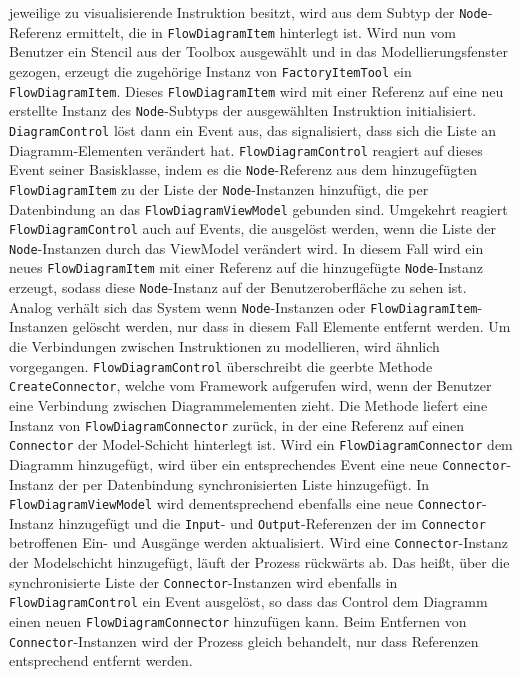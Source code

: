 jeweilige zu visualisierende Instruktion besitzt, wird aus dem Subtyp der \texttt{Node}-Referenz ermittelt, die in \texttt{FlowDiagramItem} hinterlegt ist.
\newline
Wird nun vom Benutzer ein Stencil aus der Toolbox ausgewählt und in das Modellierungsfenster gezogen, erzeugt die zugehörige Instanz von \texttt{FactoryItemTool} ein \texttt{FlowDiagramItem}. Dieses \texttt{FlowDiagramItem} wird mit einer Referenz auf eine neu erstellte Instanz des \texttt{Node}-Subtyps der ausgewählten Instruktion initialisiert. \texttt{DiagramControl} löst dann ein Event aus, das signalisiert, dass sich die Liste an Diagramm-Elementen verändert hat. \texttt{FlowDiagramControl} reagiert auf dieses Event seiner Basisklasse, indem es die \texttt{Node}-Referenz aus dem hinzugefügten \texttt{FlowDiagramItem} zu der Liste der \texttt{Node}-Instanzen hinzufügt, die per Datenbindung an das \texttt{FlowDiagramViewModel} gebunden sind. Umgekehrt reagiert \texttt{FlowDiagramControl} auch auf Events, die ausgelöst werden, wenn die Liste der \texttt{Node}-Instanzen durch das ViewModel verändert wird. In diesem Fall wird ein neues \texttt{FlowDiagramItem} mit einer Referenz auf die hinzugefügte \texttt{Node}-Instanz erzeugt, sodass diese \texttt{Node}-Instanz auf der Benutzeroberfläche zu sehen ist. Analog verhält sich das System wenn \texttt{Node}-Instanzen oder \texttt{FlowDiagramItem}-Instanzen gelöscht werden, nur dass in diesem Fall Elemente entfernt werden.
\newline
Um die Verbindungen zwischen Instruktionen zu modellieren, wird ähnlich vorgegangen. \texttt{FlowDiagramControl} überschreibt die geerbte Methode \texttt{CreateConnector}, welche vom Framework aufgerufen wird, wenn der Benutzer eine Verbindung zwischen Diagrammelementen zieht. Die Methode liefert eine Instanz von \texttt{Flow\-Dia\-gram\-Con\-nec\-tor} zurück, in der eine Referenz auf einen \texttt{Connector} der Model-Schicht hinterlegt ist. Wird ein \texttt{FlowDiagramConnector} dem Diagramm hinzugefügt, wird über ein entsprechendes Event eine neue \texttt{Connector}-Instanz der per Datenbindung synchronisierten Liste hinzugefügt. In \texttt{FlowDiagramViewModel} wird dementsprechend ebenfalls eine neue \texttt{Connector}-Instanz hinzugefügt und die \texttt{Input}- und \texttt{Output}-Referenzen der im \texttt{Connector} betroffenen Ein- und Ausgänge werden aktualisiert. Wird eine \texttt{Connector}-Instanz der Modelschicht hinzugefügt, läuft der Prozess rückwärts ab. Das heißt, über die synchronisierte Liste der \texttt{Connector}-Instanzen wird ebenfalls in \texttt{FlowDiagramControl} ein Event ausgelöst, so dass das Control dem Diagramm einen neuen \texttt{Flow\-Dia\-gram\-Co\-nnec\-tor} hinzufügen kann. Beim Entfernen von \texttt{Connector}-Instanzen wird der Prozess gleich behandelt, nur dass Referenzen entsprechend entfernt werden.      

